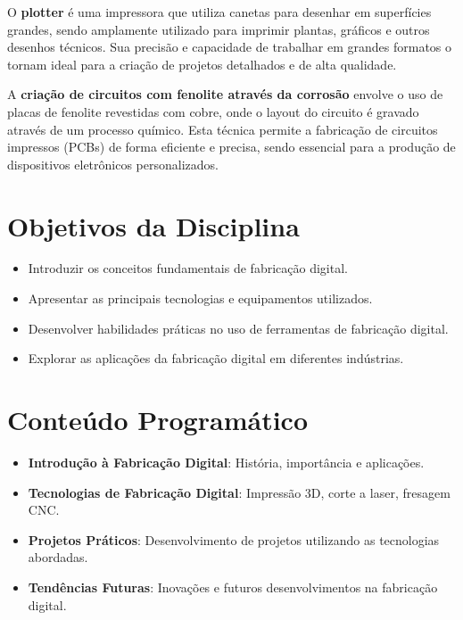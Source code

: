 \documentclass[
]{book}
\providecommand{\tightlist}{%
  \setlength{\itemsep}{0pt}\setlength{\parskip}{0pt}}
\begin{document}
O \textbf{plotter} é uma impressora que utiliza canetas para desenhar em superfícies grandes, sendo amplamente utilizado para imprimir plantas, gráficos e outros desenhos técnicos. Sua precisão e capacidade de trabalhar em grandes formatos o tornam ideal para a criação de projetos detalhados e de alta qualidade.

A \textbf{criação de circuitos com fenolite através da corrosão} envolve o uso de placas de fenolite revestidas com cobre, onde o layout do circuito é gravado através de um processo químico. Esta técnica permite a fabricação de circuitos impressos (PCBs) de forma eficiente e precisa, sendo essencial para a produção de dispositivos eletrônicos personalizados.

\section{Objetivos da Disciplina}\label{objetivos-da-disciplina}

\begin{itemize}
\tightlist
\item
  Introduzir os conceitos fundamentais de fabricação digital.
\item
  Apresentar as principais tecnologias e equipamentos utilizados.
\item
  Desenvolver habilidades práticas no uso de ferramentas de fabricação digital.
\item
  Explorar as aplicações da fabricação digital em diferentes indústrias.
\end{itemize}

\section{Conteúdo Programático}\label{conteuxfado-programuxe1tico}

\begin{itemize}
\tightlist
\item
  \textbf{Introdução à Fabricação Digital}: História, importância e aplicações.
\item
  \textbf{Tecnologias de Fabricação Digital}: Impressão 3D, corte a laser, fresagem CNC.
\item
  \textbf{Projetos Práticos}: Desenvolvimento de projetos utilizando as tecnologias abordadas.
\item
  \textbf{Tendências Futuras}: Inovações e futuros desenvolvimentos na fabricação digital.
\end{itemize}
\end{document}
